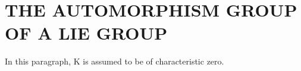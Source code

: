 \section{THE AUTOMORPHISM GROUP OF A LIE GROUP}

In this paragraph, K is assumed to be of characteristic zero.

